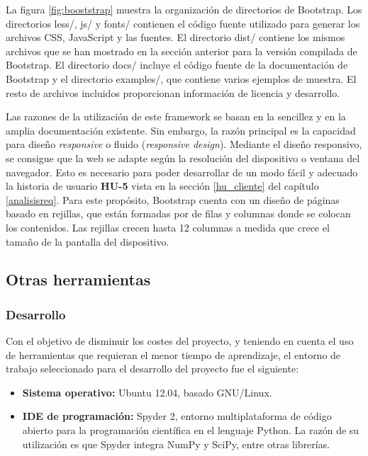 La figura \ref{fig:booststrap} muestra la organización de directorios de Bootstrap. Los directorios less/, js/ y fonts/ contienen el código fuente utilizado para generar los archivos CSS, JavaScript y las fuentes. El directorio dist/ contiene los mismos archivos que se han mostrado en la sección anterior para la versión compilada de Bootstrap. El directorio docs/ incluye el código fuente de la documentación de Bootstrap y el directorio examples/, que contiene varios ejemplos de muestra. El resto de archivos incluidos proporcionan información de licencia y desarrollo.

Las razones de la utilización de este framework se basan en la sencillez y en la amplia documentación existente. Sin embargo, la razón principal es la capacidad para diseño \textit{responsive} o fluido (\textit{responsive design}). Mediante el diseño responsivo, se consigue que la web se adapte según la resolución del dispositivo o ventana del navegador. Esto es necesario para poder desarrollar de un modo fácil y adecuado la historia de usuario \textbf{HU-5} vista en la sección \ref{hu_cliente} del capítulo \ref{analisisreq}. Para este propósito, Bootstrap cuenta con un diseño de páginas basado en rejillas, que están formadas por de filas y columnas donde se colocan los contenidos. Las rejillas crecen hasta 12 columnas a medida que crece el tamaño de la pantalla del dispositivo.

\subsection{Otras herramientas}
\subsubsection{\textbf{Desarrollo}}
Con el objetivo de disminuir los costes del proyecto, y teniendo en cuenta el uso de herramientas que requieran el menor tiempo de aprendizaje, el entorno de trabajo seleccionado para el desarrollo del proyecto fue el siguiente:
\begin{itemize}
\item \textbf{Sistema operativo:} Ubuntu 12.04, basado GNU/Linux.
\item \textbf{IDE de programación:} Spyder 2, entorno multiplataforma de código abierto para la programación científica en el lenguaje Python. La razón de su utilización es que Spyder integra NumPy y SciPy, entre otras librerías.
\end{itemize}
